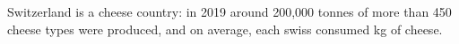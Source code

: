 Switzerland is a cheese country: in 2019 around 200,000 tonnes of more than 450 cheese types were produced, and on average, each swiss consumed \unit[20]{kg} of cheese.
